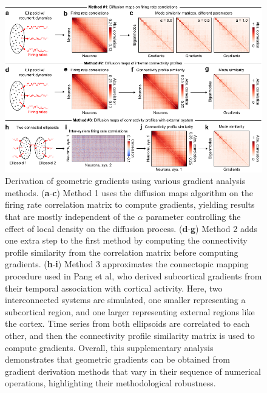 \documentclass{article}
\begin{document}
\begin{figure}[t]
    \centering
    \includegraphics[width=1.0\linewidth]{figures/supp_gradient_methods.pdf}
    \caption{Derivation of geometric gradients using various gradient analysis methods. (\textbf{a}-\textbf{c}) Method 1 uses the diffusion maps algorithm on the firing rate correlation matrix to compute gradients, yielding results that are mostly independent of the $\alpha$ parameter controlling the effect of local density on the diffusion process. (\textbf{d}-\textbf{g}) Method 2 adds one extra step to the first method by computing the connectivity profile similarity from the correlation matrix before computing gradients. (\textbf{h}-\textbf{i}) Method 3 approximates the connectopic mapping procedure used in Pang et al, who derived subcortical gradients from their temporal association with cortical activity. Here, two interconnected systems are simulated, one smaller representing a subcortical region, and one larger representing external regions like the cortex. Time series from both ellipsoids are correlated to each other, and then the connectivity profile similarity matrix is used to compute gradients. Overall, this supplementary analysis demonstrates that geometric gradients can be obtained from gradient derivation methods that vary in their sequence of numerical operations, highlighting their methodological robustness.}
    \label{supp_methods}
\end{figure}

\newpage
\end{document}
